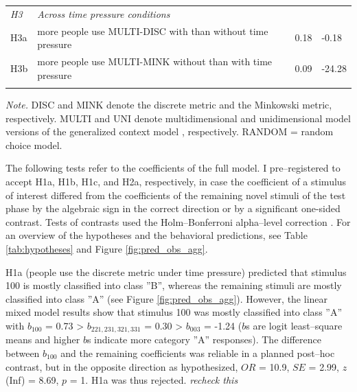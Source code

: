 \documentclass[a4paper,man,natbib]{apa6}
\begin{document}
\begin{table}
\begin{center}
\begin{threeparttable}
\begin{tabular*}{\textwidth}{lp{55mm}p{100mm}ll}
\midrule
\multicolumn{1}{l}{\emph{H3}} & \multicolumn{1}{l}{\emph{Across time pressure conditions}} \\
\addlinespace
H3a & \multicolumn{2}{p{150mm}}{more people use MULTI-DISC with than without time pressure} & 0.18 & -0.18\\
\addlinespace
H3b & \multicolumn{2}{p{150mm}}{more people use MULTI-MINK without than with time pressure} & 0.09 & -24.28\\
\bottomrule
\addlinespace
\end{tabular*}
\begin{tablenotes}[para]
\textit{Note.} DISC and MINK denote the discrete metric and the Minkowski metric, respectively. MULTI and UNI denote multidimensional and unidimensional model versions of the generalized context model \citep{nosofsky1989further}, respectively. RANDOM = random choice model.
\end{tablenotes}
\end{threeparttable}
\end{center}
\end{table}
\vspace{\baselineskip}

The following tests refer to the coefficients of the full model. I pre--registered to accept H1a, H1b, H1c, and H2a, respectively, in case the coefficient of a stimulus of interest differed from the coefficients of the remaining novel stimuli of the test phase by the algebraic sign in the correct direction or by a significant one-sided contrast. Tests of contrasts used the Holm--Bonferroni alpha--level correction \citep{holm1979simple}. For an overview of the hypotheses and the behavioral predictions, see Table \ref{tab:hypotheses} and Figure \ref{fig:pred_obs_agg}. 

H1a (people use the discrete metric under time pressure) predicted that stimulus 100 is mostly classified into class ''B'', whereas the remaining stimuli are mostly classified into class ''A'' (see Figure \ref{fig:pred_obs_agg}). However, the linear mixed model results show that stimulus 100 was mostly classified into class ''A'' with $b_{100}$ = 0.73 > $ b_{221,231,321,331}$ = 0.30 > $b_{003}$ = -1.24 ($b$s are logit least--square means and higher $b$s indicate more category ''A'' responses). The difference between $b_{100}$ and the remaining coefficients was reliable in a planned post--hoc contrast, but in the opposite direction as hypothesized, $OR$ = 10.9, $SE$ = 2.99, $z$(Inf) = 8.69, $p$ = 1. H1a was thus rejected. \textit{recheck this} 
\end{document}
